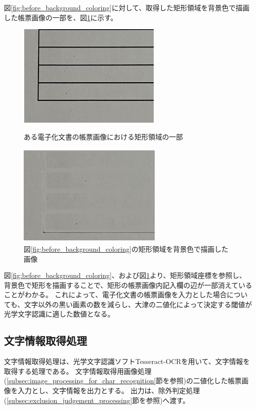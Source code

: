 図\ref{fig:before_background_coloring}に対して、取得した矩形領域を背景色で描画した帳票画像の一部を、図\ref{fig:after_background_coloring}に示す。
\begin{figure}[tp]
    \centering
    \begin{minipage}[c]{0.45\linewidth}
        \centering
        \includegraphics[width=7cm, height=5cm]{image/04-implementation/before_background_coloring.jpg}
        \caption{ある電子化文書の帳票画像における矩形領域の一部}
        \label{fig:before_background_coloring}
    \end{minipage}
    \begin{minipage}[c]{0.45\linewidth}
        \centering
        \includegraphics[width=7cm, height=5cm]{image/04-implementation/after_background_coloring.png}
        \caption{図\ref{fig:before_background_coloring}の矩形領域を背景色で描画した画像}
        \label{fig:after_background_coloring}
    \end{minipage}
\end{figure}
図\ref{fig:before_background_coloring}、および図\ref{fig:after_background_coloring}より、矩形領域座標を参照し、背景色で矩形を描画することで、矩形の帳票画像内記入欄の辺が一部消えていることがわかる。
これによって、電子化文書の帳票画像を入力とした場合についても、文字以外の黒い画素の数を減らし、大津の二値化によって決定する閾値が光学文字認識に適した数値となる。

\subsection{文字情報取得処理}\label{subsec:char_information_obtainment_processing}
文字情報取得処理は、光学文字認識ソフトTesseract-OCRを用いて、文字情報を取得する処理である。
文字情報取得用画像処理(\ref{subsec:image_processing_for_char_recognition}節を参照)の二値化した帳票画像を入力とし、文字情報を出力とする。
出力は、除外判定処理(\ref{subsec:exclusion_judgement_processing}節を参照)へ渡す。


